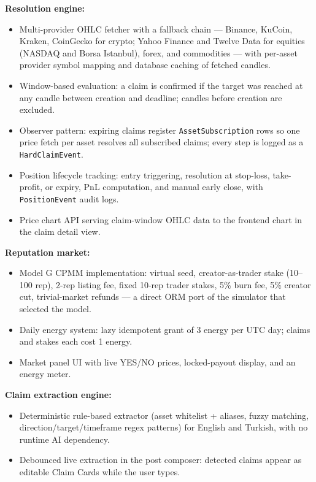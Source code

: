 \documentclass[a4paper,12pt]{report}
\begin{document}
\textbf{Resolution engine:}
\begin{itemize}
    \item Multi-provider OHLC fetcher with a fallback chain --- Binance, KuCoin, Kraken, CoinGecko for crypto; Yahoo Finance and Twelve Data for equities (NASDAQ and Borsa Istanbul), forex, and commodities --- with per-asset provider symbol mapping and database caching of fetched candles.
    \item Window-based evaluation: a claim is confirmed if the target was reached at any candle between creation and deadline; candles before creation are excluded.
    \item Observer pattern: expiring claims register \texttt{AssetSubscription} rows so one price fetch per asset resolves all subscribed claims; every step is logged as a \texttt{HardClaimEvent}.
    \item Position lifecycle tracking: entry triggering, resolution at stop-loss, take-profit, or expiry, PnL computation, and manual early close, with \texttt{PositionEvent} audit logs.
    \item Price chart API serving claim-window OHLC data to the frontend chart in the claim detail view.
\end{itemize}

\textbf{Reputation market:}
\begin{itemize}
    \item Model G CPMM implementation: virtual seed, creator-as-trader stake (10--100 rep), 2-rep listing fee, fixed 10-rep trader stakes, 5\% burn fee, 5\% creator cut, trivial-market refunds --- a direct ORM port of the simulator that selected the model.
    \item Daily energy system: lazy idempotent grant of 3 energy per UTC day; claims and stakes each cost 1 energy.
    \item Market panel UI with live YES/NO prices, locked-payout display, and an energy meter.
\end{itemize}

\textbf{Claim extraction engine:}
\begin{itemize}
    \item Deterministic rule-based extractor (asset whitelist + aliases, fuzzy matching, direction/target/timeframe regex patterns) for English and Turkish, with no runtime AI dependency.
    \item Debounced live extraction in the post composer: detected claims appear as editable Claim Cards while the user types.
\end{itemize}
\end{document}
